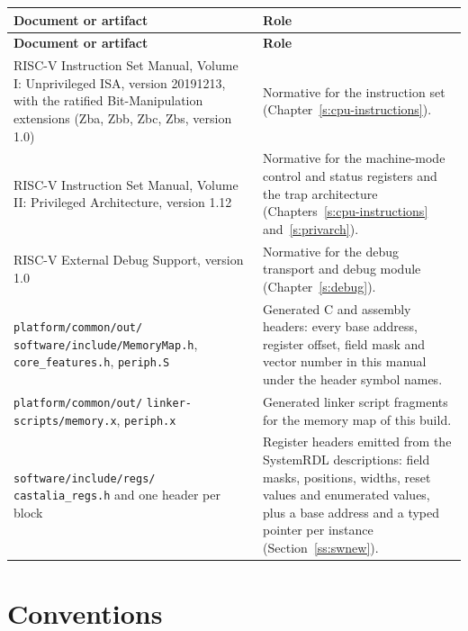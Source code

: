 \documentclass[11pt,pdftex,openany,letterpaper]{report}
\begin{document}
\begin{tabularx}{\textwidth}{p{5.6cm} X}
\caption{Documents and generated artifacts related to this manual.} \label{t:related-docs} \\
\hline \textbf{Document or artifact} & \textbf{Role} \\ \hline \endfirsthead
\hline \textbf{Document or artifact} & \textbf{Role} \\ \hline \endhead
RISC-V Instruction Set Manual, Volume I: Unprivileged ISA, version 20191213, with the ratified Bit-Manipulation extensions (Zba, Zbb, Zbc, Zbs, version 1.0) & Normative for the instruction set (Chapter~\ref{s:cpu-instructions}). \\
\rowcolor{tablehighlightcolor} RISC-V Instruction Set Manual, Volume II: Privileged Architecture, version 1.12 & Normative for the machine-mode control and status registers and the trap architecture (Chapters~\ref{s:cpu-instructions} and~\ref{s:privarch}). \\
RISC-V External Debug Support, version 1.0 & Normative for the debug transport and debug module (Chapter~\ref{s:debug}). \\
\rowcolor{tablehighlightcolor} \texttt{platform/common/out/} \texttt{software/include/MemoryMap.h}, \texttt{core\_features.h}, \texttt{periph.S} & Generated C and assembly headers: every base address, register offset, field mask and vector number in this manual under the header symbol names. \\
\texttt{platform/common/out/} \texttt{linker-scripts/memory.x}, \texttt{periph.x} & Generated linker script fragments for the memory map of this build. \\
\rowcolor{tablehighlightcolor} \texttt{software/include/regs/} \texttt{castalia\_regs.h} and one header per block & Register headers emitted from the SystemRDL descriptions: field masks, positions, widths, reset values and enumerated values, plus a base address and a typed pointer per instance (Section~\ref{ss:swnew}). \\
\hline
\end{tabularx}

\section{Conventions} \label{ss:conventions}
\end{document}
